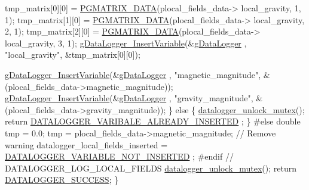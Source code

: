 \begin{DoxyCode}
        tmp\_matrix[0][0] = \hyperlink{gmatrix_8h_a7333180c47234295df2bd7b09ac00da8}{PGMATRIX\_DATA}(plocal\_fields\_data->
      local\_gravity, 1, 1);
        tmp\_matrix[1][0] = \hyperlink{gmatrix_8h_a7333180c47234295df2bd7b09ac00da8}{PGMATRIX\_DATA}(plocal\_fields\_data->
      local\_gravity, 2, 1);
        tmp\_matrix[2][0] = \hyperlink{gmatrix_8h_a7333180c47234295df2bd7b09ac00da8}{PGMATRIX\_DATA}(plocal\_fields\_data->
      local\_gravity, 3, 1);
        \hyperlink{gdatalogger_8c_a32674e7c2afa8b78e99a0070cf4bcaf9}{gDataLogger\_InsertVariable}(&\hyperlink{datalogger_01_07Caio-PC's_01conflicted_01copy_012012-11-23_08_8c_abe3b9c2c4e21e79c7b046b5986d13acc}{gDataLogger}
      , \textcolor{stringliteral}{"local\_gravity"}, &tmp\_matrix[0][0]);

        \hyperlink{gdatalogger_8c_a32674e7c2afa8b78e99a0070cf4bcaf9}{gDataLogger\_InsertVariable}(&\hyperlink{datalogger_01_07Caio-PC's_01conflicted_01copy_012012-11-23_08_8c_abe3b9c2c4e21e79c7b046b5986d13acc}{gDataLogger}
      , \textcolor{stringliteral}{"magnetic\_magnitude"}, &(plocal\_fields\_data->magnetic\_magnitude));
        \hyperlink{gdatalogger_8c_a32674e7c2afa8b78e99a0070cf4bcaf9}{gDataLogger\_InsertVariable}(&\hyperlink{datalogger_01_07Caio-PC's_01conflicted_01copy_012012-11-23_08_8c_abe3b9c2c4e21e79c7b046b5986d13acc}{gDataLogger}
      , \textcolor{stringliteral}{"gravity\_magnitude"}, &(plocal\_fields\_data->gravity\_magnitude));
    \}
    \textcolor{keywordflow}{else}
        \{
        \hyperlink{datalogger_01_07Caio-PC's_01conflicted_01copy_012012-11-23_08_8c_a85453211c0c809083c36cc56b275aeeb}{datalogger\_unlock\_mutex}();
        \textcolor{keywordflow}{return} \hyperlink{datalogger_01_07Caio-PC's_01conflicted_01copy_012012-11-23_08_8h_ac76269a113d60c063e857d14e4a2f640}{DATALOGGER\_VARIBALE\_ALREADY\_INSERTED}
      ;
        \}
\textcolor{preprocessor}{    #else}
\textcolor{preprocessor}{}    \textcolor{keywordtype}{double} tmp = 0.0;
    tmp = plocal\_fields\_data->magnetic\_magnitude; \textcolor{comment}{// Remove warning}
    datalogger\_local\_fields\_inserted = \hyperlink{datalogger_01_07Caio-PC's_01conflicted_01copy_012012-11-23_08_8h_a1f4fd2dbd981cf35467ab688c9157a74}{DATALOGGER\_VARIABLE\_NOT\_INSERTED}
      ;
\textcolor{preprocessor}{    #endif // DATALOGGER\_LOG\_LOCAL\_FIELDS}
\textcolor{preprocessor}{}    \hyperlink{datalogger_01_07Caio-PC's_01conflicted_01copy_012012-11-23_08_8c_a85453211c0c809083c36cc56b275aeeb}{datalogger\_unlock\_mutex}();
    \textcolor{keywordflow}{return} \hyperlink{datalogger_01_07Caio-PC's_01conflicted_01copy_012012-11-23_08_8h_abddebaf71d26d40183fccbb1a766b983}{DATALOGGER\_SUCCESS};
\}
\end{DoxyCode}
